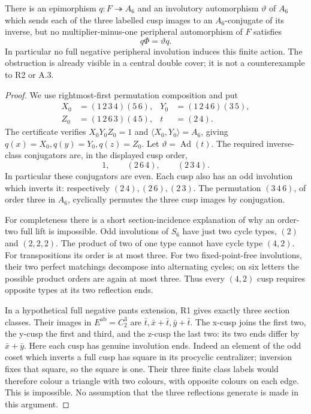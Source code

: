 There is an epimorphism \(q:F\twoheadrightarrow A_6\)
and an involutory automorphism \(\vartheta\) of
\(A_6\) which sends each of the three labelled
cusp images to an \(A_6\)-conjugate of its inverse,
but no multiplier-minus-one peripheral automorphism
of \(F\) satisfies
\[
                       q\Phi=\vartheta q.
\]
In particular no full negative peripheral involution
induces this finite action. The obstruction is
already visible in a central double cover; it is
not a counterexample to R2 or A.3.

\begin{proof}
We use rightmost-first permutation composition and put
\[
\begin{aligned}
 X_0&=(1\,2\,3\,4)(5\,6),&
 Y_0&=(1\,2\,4\,6)(3\,5),\\
 Z_0&=(1\,2\,6\,3)(4\,5),&
 t&=(2\,4).
\end{aligned}
\]
The certificate 
verifies \(X_0Y_0Z_0=1\) and
\(\langle X_0,Y_0\rangle=A_6\), giving
\(q(x)=X_0,q(y)=Y_0,q(z)=Z_0\).
Let \(\vartheta=\operatorname{Ad}(t)\).
The required inverse-class conjugators are,
in the displayed cusp order,
\[
                    1,\qquad(2\,6\,4),\qquad(2\,3\,4).
\]
In particular these conjugators are even.
Each cusp also has an odd involution which
inverts it: respectively \((2\,4),(2\,6),(2\,3)\).
The permutation \((3\,4\,6)\), of order three
in \(A_6\), cyclically permutes the three
cusp images by conjugation.

For completeness there is a short section-incidence
explanation of why an order-two full lift is impossible.
Odd involutions of \(S_6\) have just two cycle types,
\((2)\) and \((2,2,2)\). The product of two of
one type cannot have cycle type \((4,2)\).
For transpositions its order is at most three.
For two fixed-point-free involutions, their two
perfect matchings decompose into alternating cycles;
on six letters the possible product orders are
again at most three. Thus every \((4,2)\) cusp
requires opposite types at its two reflection ends.

In a hypothetical full negative pants extension,
R1 gives exactly three section classes. Their
images in
\(E^{\mathrm{ab}}=C_2^3\) are
\(\bar t,\bar x+\bar t,\bar y+\bar t\).
The x-cusp joins the first two, the y-cusp the
first and third, and the z-cusp the last two:
its two ends differ by \(\bar x+\bar y\).
Here each cusp has genuine involution ends.
Indeed an element of the odd coset which inverts
a full cusp has square in its procyclic centralizer;
inversion fixes that square, so the square is one.
Their three finite class labels would therefore
colour a triangle with two colours, with opposite
colours on each edge. This is impossible. No
assumption that the three reflections generate
is made in this argument.


\end{proof}
